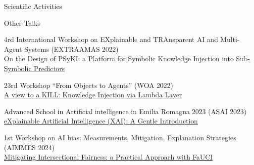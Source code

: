 \documentclass{resume} %
\begin{document}
\begin{rSection}{Scientific Activities}
        \begin{rSubsection2}{Other Talks}
            \item 4rd International Workshop on EXplainable and TRAnsparent AI and Multi-Agent Systems (EXTRAAMAS 2022)
            \\\href{https://apice.unibo.it/xwiki/bin/view/Talk/PsykiExtraamas2022}{On the Design of PSyKI: a Platform for Symbolic Knowledge Injection into Sub-Symbolic Predictors}
            \item 23rd Workshop ``From Objects to Agents'' (WOA 2022)
            \\\href{https://apice.unibo.it/xwiki/bin/view/Talk/KillWoa2022}{A view to a KILL: Knowledge Injection via Lambda Layer}
            \item Advanced School in Artificial intelligence in Emilia Romagna 2023 (ASAI 2023)
            \\\href{https://apice.unibo.it/xwiki/bin/view/Talk/XaiAsaiErBertinoro2023}{eXplainable Artificial Intelligence (XAI): A Gentle Introduction}
            \item 1st Workshop on AI bias: Measurements, Mitigation, Explanation Strategies (AIMMES 2024)
            \\\href{https://apice.unibo.it/xwiki/bin/view/Talk/IntersectionalityAimmes2024}{Mitigating Intersectional Fairness: a Practical Approach with FaUCI}
        \end{rSubsection2}

    \end{rSection}


\end{document}
